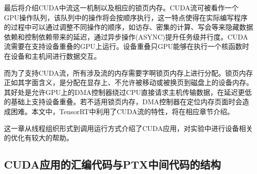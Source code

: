 \par 最后将介绍CUDA中流这一机制以及相应的锁页内存。CUDA流可被看作一个GPU操作队列，该队列中的操作将会按顺序执行，这一特点使得在实际编写程序的过程中可以通过调整不同操作的顺序，如访存、密集的计算、写会等来隐藏数据依赖和控制依赖带来的延迟\parencite{STREAM}，通过异步操作(ASYNC)提升任务级并行度。CUDA流需要在支持设备重叠的GPU上运行。设备重叠只GPU能够在执行一个核函数时在设备和主机间进行数据交互。
\par 而为了支持CUDA流，所有涉及流的内存需要字啊锁页内存上进行分配。锁页内存正如其字面含义，是分配在显存上、不允许被移动或被换页到磁盘上的设备内存。其好处是允许GPU上的DMA控制器绕过CPU直接请求主机传输数据，在延迟更低的基础上支持设备重叠。若不适用锁页内存，DMA控制器在定位内存页面时会造成困难。本文中，TensorRT中利用了CUDA流的特性，将在相应章节介绍。
\par 这一章从线程组织形式到调用运行方式介绍了CUDA应用，对实验中进行设备相关的优化有较大的帮助。

\subsection{CUDA应用的汇编代码与PTX中间代码的结构}

